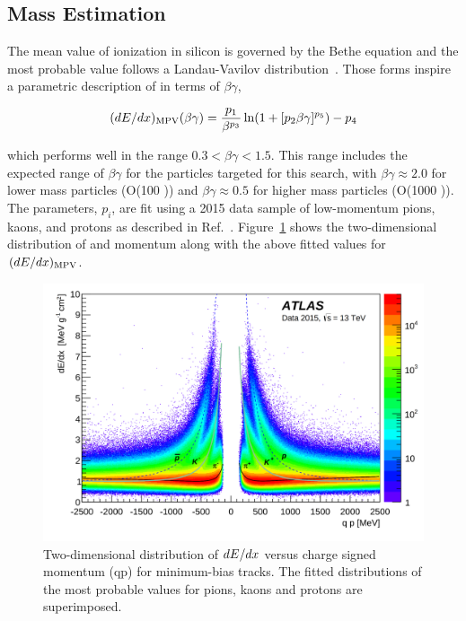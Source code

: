 \subsection{Mass Estimation}
\label{sec:mass_requirement}
The mean value of ionization in silicon is governed by the Bethe equation and the most probable value follows a Landau-Vavilov distribution~\cite{pdg}. 
Those forms inspire a parametric description of \dedx in terms of $\beta\gamma$, 

\begin{equation}
(dE/dx)_\mathrm{MPV}(\beta \gamma) = {p_1\over \beta^{p_3}}\ln(1+[p_2\beta\gamma]^{p_5})-p_4 \label{eq:bbfun}
\end{equation}

\noindent which performs well in the range $0.3< \beta\gamma<1.5$.
This range includes the expected range of $\beta\gamma$ for the particles targeted for this search, with $\beta\gamma \approx 2.0$ for lower mass particles (O(100 \GeV)) and $\beta\gamma \approx 0.5$ for higher mass particles (O(1000 \GeV)). 
The parameters, $p_i$, are fit using a 2015 data sample of low-momentum pions, kaons, and protons as described in Ref.~\cite{dedxnote}. 
Figure~\ref{fig:dedx_momentum} shows the two-dimensional distribution of \dedx and momentum along with the above fitted values for $(dE/dx)_\mathrm{MPV}$.

\begin{figure}
\centering
\includegraphics[width=\fullfig]{figures/dedx_momentum.png}
\caption{Two-dimensional distribution of $dE/dx$ versus charge signed momentum (qp) for minimum-bias tracks. The fitted distributions of the most probable values for pions, kaons and protons are superimposed.}
\label{fig:dedx_momentum}
\end{figure}

